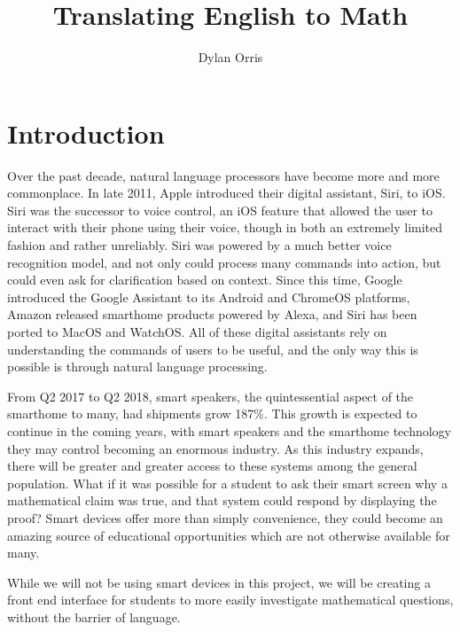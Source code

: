 \documentclass[12pt]{article}
\begin{document}
\title{Translating English to Math}
\author{Dylan Orris}
\maketitle
\tableofcontents
\pagebreak
\section{Introduction}
Over the past decade, natural language processors have become more and more commonplace. In late 2011, Apple introduced their digital assistant, Siri, to iOS. Siri was the successor to voice control, an iOS feature that allowed the user to interact with their phone using their voice, though in both an extremely limited fashion and rather unreliably. Siri was powered by a much better voice recognition model, and not only could process many commands into action, but could even ask for clarification based on context. Since this time, Google introduced the Google Assistant to its Android and ChromeOS platforms, Amazon released smarthome products powered by Alexa, and Siri has been ported to MacOS and WatchOS. All of these digital assistants rely on understanding the commands of users to be useful, and the only way this is possible is through natural language processing. 

From Q2 2017 to Q2 2018, smart speakers, the quintessential aspect of the smarthome to many, had shipments grow 187\%. %
This growth is expected to continue in the coming years, with smart speakers and the smarthome technology they may control becoming an enormous industry. As this industry expands, there will be greater and greater access to these systems among the general population. What if it was possible for a student to ask their smart screen why a mathematical claim was true, and that system could respond by displaying the proof? Smart devices offer more than simply convenience, they could become an amazing source of educational opportunities which are not otherwise available for many.

While we will not be using smart devices in this project, we will be creating a front end interface for students to more easily investigate mathematical questions, without the barrier of language.
\end{document}

